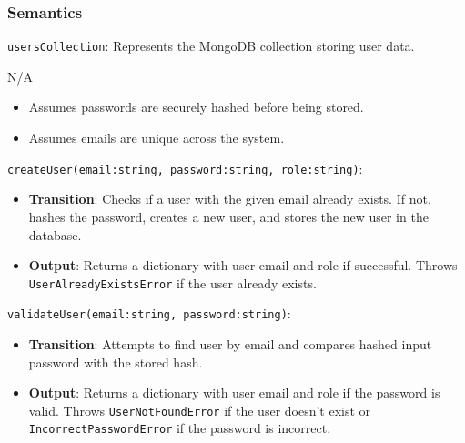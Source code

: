 \documentclass[12pt, titlepage]{article}
\begin{document}
\subsubsection{Semantics}
\begin{description}
  \item[State Variables:]
  \item
  \texttt{usersCollection}: Represents the MongoDB collection storing user data.
  \item[Environment Variables:]
  \item N/A
  \item[Assumptions:]
  \item
  \begin{itemize}
    \item Assumes passwords are securely hashed before being stored.
  \end{itemize}
  \item
  \begin{itemize}
    \item Assumes emails are unique across the system.
  \end{itemize}

  \item[Access Routine Semantics:] 
  \item
  \texttt{createUser(email:string, password:string, role:string)}:
  \item
  \begin{itemize}
    \item \textbf{Transition}: Checks if a user with the given email already
    exists. If not, hashes the password, creates a new user, and stores the new
    user in the database.
  \end{itemize}
  \item
  \begin{itemize}
    \item \textbf{Output}: Returns a dictionary with user email and role if
    successful. Throws \\
    \texttt{UserAlreadyExistsError} if the user already exists.
  \end{itemize}

  \item
  \texttt{validateUser(email:string, password:string)}:
  \item
  \begin{itemize}
    \item \textbf{Transition}: Attempts to find user by email and compares hashed
    input password with the stored hash.
  \end{itemize}
  \item
  \begin{itemize}
    \item \textbf{Output}: Returns a dictionary with user email and role if the password is valid. Throws \texttt{UserNotFoundError} if the user doesn't exist or \texttt{IncorrectPasswordError} if the password is incorrect.
  \end{itemize}


\end{description}
\end{document}
